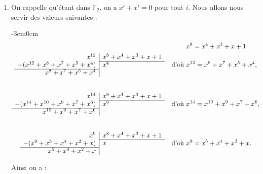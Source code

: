 \documentclass[a4paper, 12pt]{article}
\begin{document}
\begin{enumerate}[label=\textbf{Question \arabic*.}, leftmargin=*]
\item On rappelle qu'étant dans $\mathbb{F}_{2}$, on a $x^i + x^i = 0$ pour tout $i$.
Nous allons nous servir des valeurs suivantes :

\begin{adjustwidth}{-3cm}{0cm}
\[
\begin{aligned}
    &\quad \phantom{\text{d'où }} x^8 = x^4 + x^3 + x + 1 \\
\begin{array}{r|l}
  x^{12} & x^8 + x^4 + x^3 + x + 1 \\
  \cline{2-2}
  - (x^{12} + x^8 + x^7 + x^5 + x^4) & x^4 \\
  \cline{1-1}
    x^8 + x^7 + x^5 + x^4 & \\
\end{array}
  &\quad \text{d'où } x^{12} = x^8 + x^7 + x^5 + x^4, \\[2em]
\begin{array}{r|l}
  x^{14} & x^8 + x^4 + x^3 + x + 1 \\
  \cline{2-2}
  - (x^{14} + x^{10} + x^9 + x^7 + x^6) & x^6 \\
  \cline{1-1}
    x^{10} + x^9 + x^7 + x^6 & \\
\end{array}
  &\quad \text{d'où } x^{14} = x^{10} + x^9 + x^7 + x^6, \\[2em]
\begin{array}{r|l}
  x^{9} & x^8 + x^4 + x^3 + x + 1 \\
  \cline{2-2}
  - (x^9 + x^5 + x^4 + x^2 + x) & x \\
  \cline{1-1}
    x^5 + x^4 + x^2 + x & \\
\end{array}
  &\quad \text{d'où } x^{9} = x^5 + x^4 + x^2 + x.
\end{aligned}
\]
\end{adjustwidth}

Ainsi on a :


\end{enumerate}
\end{document}

